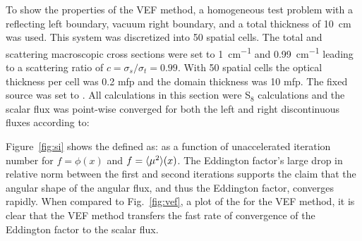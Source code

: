 To show the properties of the VEF method, a homogeneous test problem with a reflecting left boundary, vacuum right boundary, and a total thickness of \SI{10}{cm} was used. This system was discretized into 50 spatial cells. The total and scattering macroscopic cross sections were set to \SI{1}{cm^{-1}} and \SI{0.99}{cm^{-1}} leading to a scattering ratio of $c = \sigma_s/\sigma_t=0.99.$ With 50 spatial cells the optical thickness per cell was 0.2 mfp and the domain thickness was 10 mfp. The fixed source was set to . All calculations in this section were S$_8$ calculations and the scalar flux was point-wise converged for both the left and right discontinuous fluxes according to:

Figure~\ref{fig:si} shows the  defined as: 
as a function of unaccelerated iteration number for $f = \phi(x)$ and $f = \langle \mu^2 \rangle(x)$. The Eddington factor's large drop in relative norm between the first and second iterations supports the claim that the angular shape of the angular flux, and thus the Eddington factor, converges rapidly. When compared to Fig.~\ref{fig:vef}, a plot of the  for the VEF method, it is clear that the VEF method transfers the fast rate of convergence of the Eddington factor to the scalar flux. 



